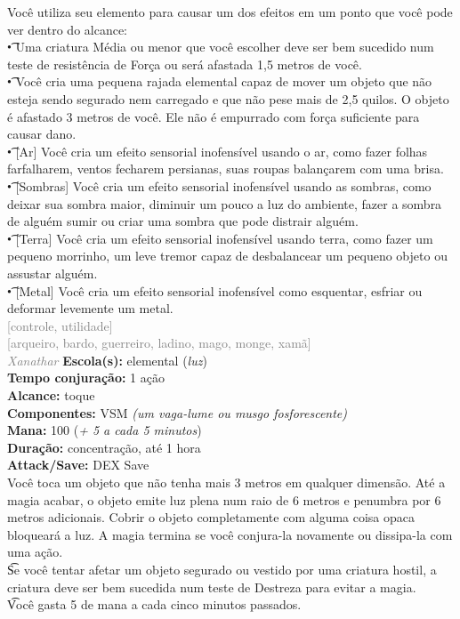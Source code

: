 \documentclass{RPG_Adventure}[2021/10/20]
\begin{document}
{\normalsize Você utiliza seu elemento para causar um dos efeitos em um ponto que você pode ver dentro do alcance:\\\t • Uma criatura Média ou menor que você escolher deve ser bem sucedido num teste de resistência de Força ou será afastada 1,5 metros de você.\\\t • Você cria uma pequena rajada elemental capaz de mover um objeto que não esteja sendo segurado nem carregado e que não pese mais de 2,5 quilos. O objeto é afastado 3 metros de você. Ele não é empurrado com força suficiente para causar dano.\\\t • [Ar] Você cria um efeito sensorial inofensível usando o ar, como fazer folhas farfalharem, ventos fecharem persianas, suas roupas balançarem com uma brisa.\\\t • [Sombras] Você cria um efeito sensorial inofensível usando as sombras, como deixar sua sombra maior, diminuir um pouco a luz do ambiente, fazer a sombra de alguém sumir ou criar uma sombra que pode distrair alguém.\\\t • [Terra] Você cria um efeito sensorial inofensível usando terra, como fazer um pequeno morrinho, um leve tremor capaz de desbalancear um pequeno objeto ou assustar alguém.\\\t • [Metal] Você cria um efeito sensorial inofensível como esquentar, esfriar ou deformar levemente um metal.\\}
{\scriptsize \textcolor{gray}{[controle, utilidade]\\}}
{\scriptsize \textcolor{gray}{[arqueiro, bardo, guerreiro, ladino, mago, monge, xamã]\\}}
{\tiny \textcolor{gray}{\textit{Xanathar}}}\jump{}
{\small \t \textbf{Escola(s):} elemental (\textit{luz})\\\t \textbf{Tempo conjuração:} 1 ação\\\t \textbf{Alcance:} toque\\\t \textbf{Componentes:} VSM \textit{(um vaga-lume ou musgo fosforescente)}\\\t \textbf{Mana:} 100 (\textit{+ 5 a cada 5 minutos})\\\t \textbf{Duração:} concentração, até 1 hora\\\t \textbf{Attack/Save:} DEX Save\\}
{\normalsize Você toca um objeto que não tenha mais 3 metros em qualquer dimensão. Até a magia acabar, o objeto emite luz plena num raio de 6 metros e penumbra por 6 metros adicionais. Cobrir o objeto completamente com alguma coisa opaca bloqueará a luz. A magia termina se você conjura-la novamente ou dissipa-la com uma ação.\\\t Se você tentar afetar um objeto segurado ou vestido por uma criatura hostil, a criatura deve ser bem sucedida num teste de Destreza para evitar a magia.\\\t Você gasta 5 de mana a cada cinco minutos passados.\\}
\end{document}
